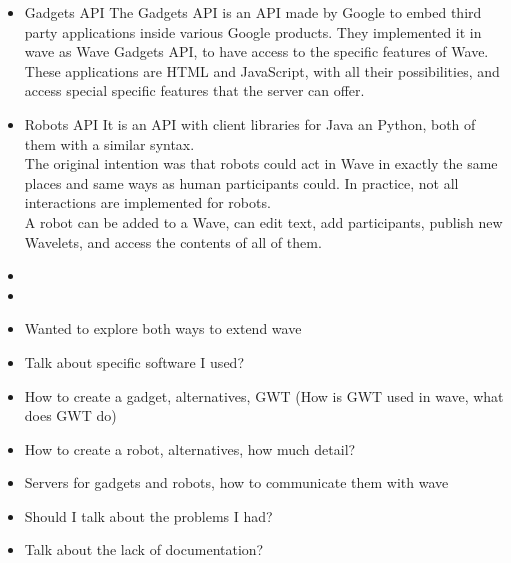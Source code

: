\begin{itemize}
  \item Gadgets API
  The Gadgets API is an API made by Google to embed third party applications inside various Google products. They implemented it in wave as Wave Gadgets API, to have access to the specific features of Wave. These applications are HTML and JavaScript, with all their possibilities, and access special specific features that the server can offer.

  \item Robots API
  It is an API with client libraries for Java an Python, both of them with a similar syntax.\\
  The original intention was that robots could act in Wave in exactly the same places and same ways as human participants could. In practice, not all interactions are implemented for robots.\\
  A robot can be added to a Wave, can edit text, add participants, publish new Wavelets, and access the contents of all of them.
\end {itemize}

\begin{itemize}
\item {}
\item {}
  \item Wanted to explore both ways to extend wave
  \item Talk about specific software I used?
  \item How to create a gadget, alternatives, GWT (How is GWT used in wave, what does GWT do)
  \item How to create a robot, alternatives, how much detail?
  \item Servers for gadgets and robots, how to communicate them with wave
  \item Should I talk about the problems I had?
  \item Talk about the lack of documentation?
\end{itemize}
